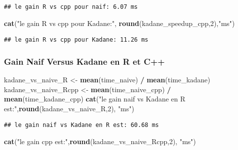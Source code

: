 \documentclass[
]{article}
\newenvironment{Shaded}{\begin{snugshade}}{\end{snugshade}}
\newcommand{\DecValTok}[1]{\textcolor[rgb]{0.00,0.00,0.81}{#1}}
\newcommand{\FunctionTok}[1]{\textcolor[rgb]{0.13,0.29,0.53}{\textbf{#1}}}
\newcommand{\NormalTok}[1]{#1}
\newcommand{\OtherTok}[1]{\textcolor[rgb]{0.56,0.35,0.01}{#1}}
\newcommand{\SpecialCharTok}[1]{\textcolor[rgb]{0.81,0.36,0.00}{\textbf{#1}}}
\newcommand{\StringTok}[1]{\textcolor[rgb]{0.31,0.60,0.02}{#1}}
\begin{document}
\begin{verbatim}
## le gain R vs cpp pour naif: 6.07 ms
\end{verbatim}

\begin{Shaded}
\begin{Highlighting}[]
\FunctionTok{cat}\NormalTok{(}\StringTok{"le gain R vs cpp pour Kadane:"}\NormalTok{, }\FunctionTok{round}\NormalTok{(kadane\_speedup\_cpp,}\DecValTok{2}\NormalTok{),}\StringTok{"ms"}\NormalTok{)}
\end{Highlighting}
\end{Shaded}

\begin{verbatim}
## le gain R vs cpp pour Kadane: 11.26 ms
\end{verbatim}

\subsubsection{Gain Naif Versus Kadane en R et
C++}\label{gain-naif-versus-kadane-en-r-et-c}

\begin{Shaded}
\begin{Highlighting}[]
\NormalTok{kadane\_vs\_naive\_R }\OtherTok{\textless{}{-}} \FunctionTok{mean}\NormalTok{(time\_naive) }\SpecialCharTok{/} \FunctionTok{mean}\NormalTok{(time\_kadane)}
\NormalTok{kadane\_vs\_naive\_Rcpp }\OtherTok{\textless{}{-}} \FunctionTok{mean}\NormalTok{(time\_naive\_cpp) }\SpecialCharTok{/} \FunctionTok{mean}\NormalTok{(time\_kadane\_cpp)}
\FunctionTok{cat}\NormalTok{(}\StringTok{"le gain naif vs Kadane en R est:"}\NormalTok{,}\FunctionTok{round}\NormalTok{(kadane\_vs\_naive\_R,}\DecValTok{2}\NormalTok{), }\StringTok{"ms"}\NormalTok{)}
\end{Highlighting}
\end{Shaded}

\begin{verbatim}
## le gain naif vs Kadane en R est: 60.68 ms
\end{verbatim}

\begin{Shaded}
\begin{Highlighting}[]
\FunctionTok{cat}\NormalTok{(}\StringTok{"le gain cpp est:"}\NormalTok{,}\FunctionTok{round}\NormalTok{(kadane\_vs\_naive\_Rcpp,}\DecValTok{2}\NormalTok{), }\StringTok{"ms"}\NormalTok{)}
\end{Highlighting}
\end{Shaded}
\end{document}
